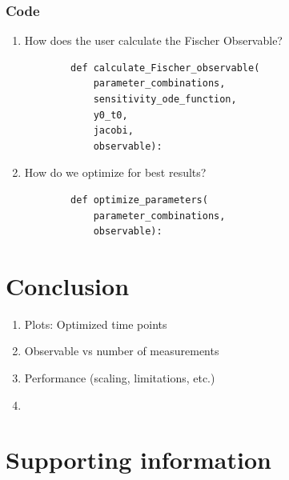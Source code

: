 \documentclass[10pt,A4paper]{article}
\begin{document}
\subsubsection*{Code}
\begin{enumerate}
    \item How does the user calculate the Fischer Observable?
    \begin{verbatim}
        def calculate_Fischer_observable(
            parameter_combinations,
            sensitivity_ode_function,
            y0_t0,
            jacobi,
            observable):
    \end{verbatim}
    \item How do we optimize for best results?
    \begin{verbatim}
        def optimize_parameters(
            parameter_combinations,
            observable):
    \end{verbatim}
\end{enumerate}
%
%
%
\section*{Conclusion}
\begin{enumerate}
    \item Plots: Optimized time points
    \item Observable vs number of measurements
    \item Performance (scaling, limitations, etc.)
    \item 
\end{enumerate}
%
%
%
\section*{Supporting information}
%
%
%
\nolinenumbers

\end{document}
